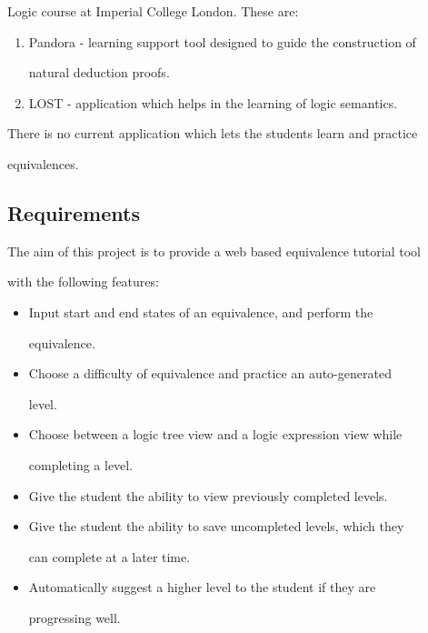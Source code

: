 \documentclass[12pt]{article}
\begin{document}
Logic course at Imperial College London. These are:

\begin{enumerate}

  \item Pandora - learning support tool designed to guide the construction of

         natural deduction proofs. 

  \item LOST - application which helps in the learning of logic semantics.

\end{enumerate}



There is no current application which lets the students learn and practice

equivalences.



\subsection{Requirements}



The aim of this project is to provide a web based equivalence tutorial tool

with the following features:

\begin{itemize}

	\item Input start and end states of an equivalence, and perform the

				equivalence.

	\item Choose a difficulty of equivalence and practice an auto-generated

				level.

	\item Choose between a logic tree view and a logic expression view while

				completing a level.

	\item Give the student the ability to view previously completed levels.

	\item Give the student the ability to save uncompleted levels, which they

				can complete at a later time.

	\item Automatically suggest a higher level to the student if they are

				progressing well.

\end{itemize}
\end{document}
